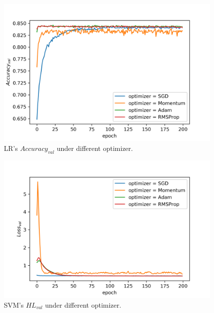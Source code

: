 \documentclass[journal, a4paper]{IEEEtran}
\begin{document}
\begin{figure}[!hbt]
	\begin{center}
		\includegraphics[width=\columnwidth]{lr_optim_val_acc}
		\caption{LR's $Accuracy_{val}$ under different optimizer.}
		\label{fig:lr_optim_val_acc}
	\end{center}
\end{figure} \par

\begin{figure}[!hbt]
	\begin{center}
		\includegraphics[width=\columnwidth]{svm_optim_val_loss}
		\caption{SVM's $HL_{val}$ under different optimizer.}
		\label{fig:svm_optim_val_loss}
	\end{center}
\end{figure} \par
\end{document}
